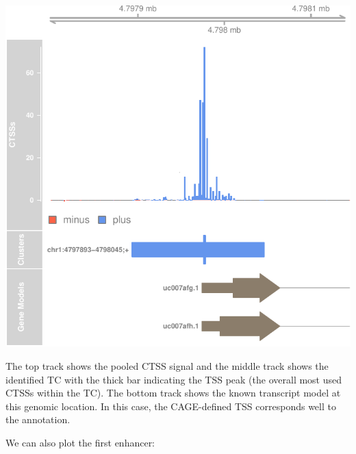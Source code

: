 \documentclass[9pt,a4paper,]{extarticle}
\newenvironment{Shaded}{\begin{snugshade}}{\end{snugshade}}
\newcommand{\KeywordTok}[1]{\textcolor[rgb]{0.13,0.29,0.53}{\textbf{{#1}}}}
\newcommand{\DataTypeTok}[1]{\textcolor[rgb]{0.13,0.29,0.53}{{#1}}}
\newcommand{\DecValTok}[1]{\textcolor[rgb]{0.00,0.00,0.81}{{#1}}}
\newcommand{\StringTok}[1]{\textcolor[rgb]{0.31,0.60,0.02}{{#1}}}
\newcommand{\CommentTok}[1]{\textcolor[rgb]{0.56,0.35,0.01}{\textit{{#1}}}}
\newcommand{\NormalTok}[1]{{#1}}
\begin{document}
\begin{center}\includegraphics{CAGEWorkflow_files/figure-latex/simpleTSS-1} \end{center}

The top track shows the pooled CTSS signal and the middle track shows the identified TC with the thick bar indicating the TSS peak (the overall most used CTSSs within the TC). The bottom track shows the known transcript model at this genomic location. In this case, the CAGE-defined TSS corresponds well to the annotation.

We can also plot the first enhancer:

\begin{Shaded}
\end{Shaded}
\end{document}
